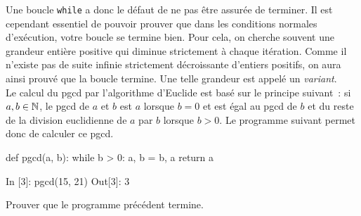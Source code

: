 \documentclass{magnolia}
\begin{document}
Une boucle \verb_while_ a donc le défaut de ne pas être assurée de terminer. Il est
cependant essentiel de pouvoir prouver que dans les conditions normales d'exécution, votre boucle se termine bien. Pour cela,
on cherche souvent une grandeur entière positive qui diminue strictement à chaque itération. Comme
il n'existe pas de suite infinie strictement décroissante d'entiers positifs, on aura
ainsi prouvé que la boucle termine. Une telle grandeur est appelé un \emph{variant}.\\

Le calcul du pgcd par l'algorithme d'Euclide est basé sur le principe suivant~:
si $a,b\in\mathbb{N}$, le pgcd de $a$ et $b$ est $a$ lorsque $b=0$ et est égal au pgcd de
$b$ et du reste de la division euclidienne de $a$ par $b$ lorsque $b>0$. Le programme
suivant permet donc de calculer ce pgcd.

\begin{pythoncodeline}
def pgcd(a, b):
    while b > 0:
        a, b = b, a %
    return a
\end{pythoncodeline}

\begin{pythoncode}
In [3]: pgcd(15, 21)
Out[3]: 3
\end{pythoncode}

\begin{exoUnique}
\exo Prouver que le programme précédent termine.
\end{exoUnique}


\end{document}
